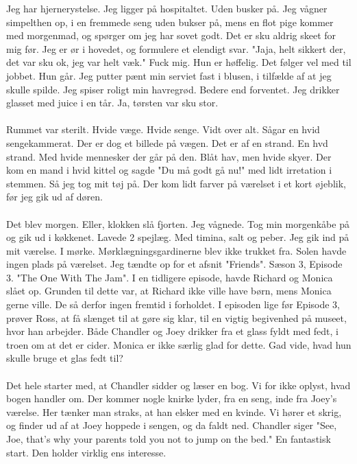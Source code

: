 \documentclass[]{article}
\begin{document}
Jeg har hjernerystelse. Jeg ligger på hospitaltet. Uden busker på. Jeg vågner simpelthen op, i en fremmede seng uden bukser på, mens en flot pige kommer med morgenmad, og spørger om jeg har sovet godt. Det er sku aldrig skeet for mig før. Jeg er ør i hovedet, og formulere et elendigt svar. "Jaja, helt sikkert der, det var sku ok, jeg var helt væk." Fuck mig. Hun er høffelig. Det følger vel med til jobbet. Hun går. Jeg putter pænt min serviet fast i blusen, i tilfælde af at jeg skulle spilde. Jeg spiser roligt min havregrød. Bedere end forventet. Jeg drikker glasset med juice i en tår. Ja, tørsten var sku stor.
\\ \\
Rummet var sterilt. Hvide væge. Hvide senge. Vidt over alt. Sågar en hvid sengekammerat. Der er dog et billede på vægen. Det er af en strand. En hvd strand. Med hvide mennesker der går på den. Blåt hav, men hvide skyer. Der kom en mand i hvid kittel og sagde "Du må godt gå nu!" med lidt irretation i stemmen. Så jeg tog mit tøj på. Der kom lidt farver på værelset i et kort øjeblik, før jeg gik ud af døren.
\\ \\
Det blev morgen. Eller, klokken slå fjorten. Jeg vågnede. Tog min morgenkåbe på og gik ud i køkkenet. Lavede 2 spejlæg. Med timina, salt og peber. Jeg gik ind på mit værelse. I mørke. Mørklægningsgardinerne blev ikke trukket fra. Solen havde ingen plads på værelset. Jeg tændte op for et afsnit "Friends". Sæson 3, Episode 3. "The One With The Jam". I en tidligere episode, havde Richard og Monica slået op. Grunden til dette var, at Richard ikke ville have børn, mens Monica gerne ville. De så derfor ingen fremtid i forholdet. I episoden lige før Episode 3, prøver Ross, at få slænget til at gøre sig klar, til en vigtig begivenhed på museet, hvor han arbejder. Både Chandler og Joey drikker fra et glass fyldt med fedt, i troen om at det er cider. Monica er ikke særlig glad for dette. Gad vide, hvad hun skulle bruge et glas fedt til?
\\ \\
Det hele starter med, at Chandler sidder og læser en bog. Vi for ikke oplyst, hvad bogen handler om. Der kommer nogle knirke lyder, fra en seng, inde fra Joey's værelse. Her tænker man straks, at han elsker med en kvinde. Vi hører et skrig, og finder ud af at Joey hoppede i sengen, og da faldt ned. Chandler siger "See, Joe, that's why your parents told you not to jump on the bed." En fantastisk start. Den holder virklig ens interesse.
\\ \\
\end{document}
